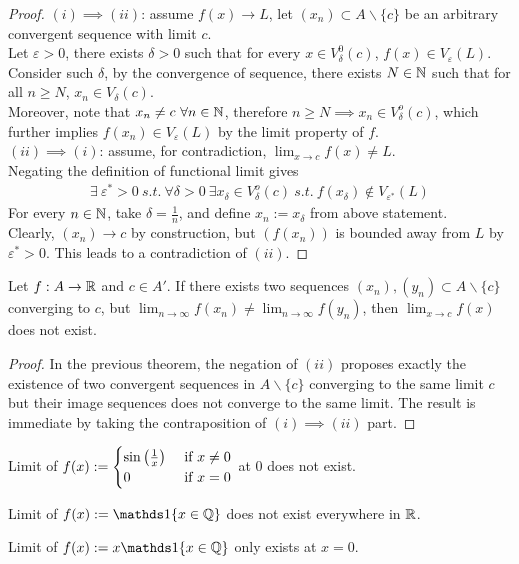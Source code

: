 \documentclass[11pt]{article}
\begin{document}
	\begin{proof}
		$(i) \implies (ii)$: assume $f(x) \to L$, let $(x_n) \subset A \backslash \{c\}$ be an arbitrary convergent sequence with limit $c$. \\
		Let $\varepsilon > 0$, there exists $\delta > 0$ such that for every $x \in V_\delta^0(c)$, $f(x) \in V_\varepsilon(L)$.\\
		Consider such $\delta$, by the convergence of sequence, there exists $N \in \mathbb{N}$ such that for all $n \geq N$, $x_n \in V_\delta(c)$.\\
		Moreover, note that $x_n \neq c\ \forall n \in \mathbb{N}$, therefore $n \geq N \implies x_n \in V_\delta^o(c)$, which further implies $f(x_n) \in V_\varepsilon(L)$ by the limit property of $f$. \\
		$(ii) \implies (i)$: assume, for contradiction, $\lim_{x \to c} f(x) \neq L$.\\
		Negating the definition of functional limit gives
		\begin{align}
			\exists\ \varepsilon^* > 0\ s.t.\ \forall \delta > 0\ \exists x_\delta \in V_\delta^o(c)\ s.t.\ f(x_\delta) \notin V_{\varepsilon^*}(L)
		\end{align}
		For every $n \in \mathbb{N}$, take $\delta = \frac{1}{n}$, and define $x_n := x_\delta$ from above statement.\\
		Clearly, $(x_n) \to c$ by construction, but $(f(x_n))$ is bounded away from $L$ by $\varepsilon^* > 0$. This leads to a contradiction of $(ii)$.
	\end{proof}
	
	\begin{theorem}
		Let $f: A \to \mathbb{R}$ and $c \in A'$. If there exists two sequences $(x_n), (y_n) \subset A \backslash \{c\}$ converging to $c$, but $\lim_{n\to\infty} f(x_n) \neq \lim_{n\to\infty} f(y_n)$, then $\lim_{x \to c} f(x)$ does not exist.
	\end{theorem}
	
	\begin{proof}
		In the previous theorem, the negation of $(ii)$ proposes exactly the existence of two convergent sequences in $A \backslash \{c\}$ converging to the same limit $c$ but their image sequences does not converge to the same limit. The result is immediate by taking the contraposition of $(i) \implies (ii)$ part.
	\end{proof}
	
	\begin{example}
		Limit of $f(x) := \begin{cases}
			\sin\left(\frac{1}{x}\right) &\text{{ if }} x \neq 0 \\
			0 &\text{{ if }} x = 0
		\end{cases}$ at 0 does not exist.
	\end{example}
	
	\begin{example}
		Limit of $f(x) := \id{x \in \Q}$ does not exist everywhere in $\mathbb{R}$.
	\end{example}
	
	\begin{example}
		Limit of $f(x) := x \id{x \in \Q}$ only exists at $x = 0$.
	\end{example}
\end{document}
